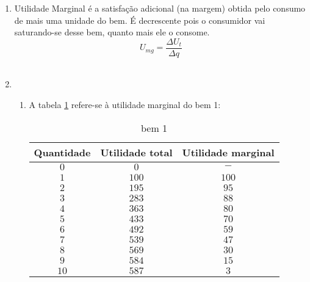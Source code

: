 \documentclass[a4paper, 12pt]{article}
\begin{document}
\begin{enumerate}
\begin{enumerate}
	\end{enumerate}
	\\

	\item Utilidade Marginal é a satisfação adicional (na margem) obtida pelo consumo de mais uma unidade do bem. É decrescente pois o consumidor vai saturando-se desse bem, quanto mais ele o consome.
	$$U_{mg} = \dfrac{\Delta U_t}{\Delta q}$$
	\\

	\item \\
	\begin{enumerate}
		\item A tabela \ref{tbl56-1} refere-se à utilidade marginal do bem 1:
		\begin{table}[H]
			\centering
			\begin{tabular}{|c|c|c|}
				\hline
				Quantidade & Utilidade total & Utilidade marginal \\ \hline
				$0$ & $0$ & $-$\\ \hline
				$1$ & $100$ & $100$\\ \hline
				$2$ & $195$ & $95$\\ \hline
				$3$ & $283$ & $88$\\ \hline
				$4$ & $363$ & $80$\\ \hline
				$5$ & $433$ & $70$\\ \hline
				$6$ & $492$ & $59$\\ \hline
				$7$ & $539$ & $47$\\ \hline
				$8$ & $569$ & $30$\\ \hline
				$9$ & $584$ & $15$\\ \hline
				$10$ & $587$ & $3$\\ \hline
			\end{tabular}
			\caption{bem 1}
			\label{tbl56-1}
		\end{table}

		\newpage


\end{enumerate}
\end{enumerate}
\end{document}
